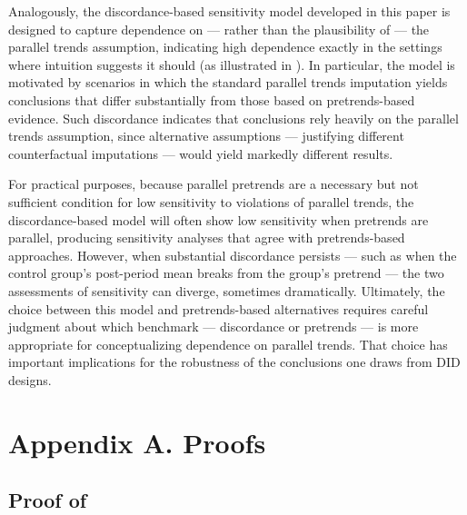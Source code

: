\documentclass[twoside,11pt]{article}
\begin{document}
Analogously, the discordance-based sensitivity model developed in this paper is designed to capture dependence on --- rather than the plausibility of --- the parallel trends assumption, indicating high dependence exactly in the settings where intuition suggests it should (as illustrated in ). In particular, the model is motivated by scenarios in which the standard parallel trends imputation yields conclusions that differ substantially from those based on pretrends-based evidence. Such discordance indicates that conclusions rely heavily on the parallel trends assumption, since alternative assumptions --- justifying different counterfactual imputations --- would yield markedly different results.

For practical purposes, because parallel pretrends are a necessary but not sufficient condition for low sensitivity to violations of parallel trends, the discordance-based model will often show low sensitivity when pretrends are parallel, producing sensitivity analyses that agree with pretrends-based approaches. However, when substantial discordance persists --- such as when the control group's post-period mean breaks from the group's pretrend --- the two assessments of sensitivity can diverge, sometimes dramatically. Ultimately, the choice between this model and pretrends-based alternatives requires careful judgment about which benchmark --- discordance or pretrends --- is more appropriate for conceptualizing dependence on parallel trends. That choice has important implications for the robustness of the conclusions one draws from DID designs.



\newpage

\appendix
\section*{Appendix A. Proofs}
\label{appx: proofs}

\subsection*{Proof of }
\end{document}
